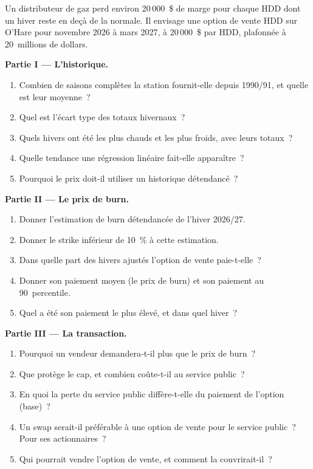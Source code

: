 \begin{problem}\label{pb:m3:freight-weather-and-other-corners:1}
Un distributeur de gaz perd environ 20\,000~\$ de marge pour chaque HDD dont un hiver reste en deçà de la normale. Il
envisage une option de vente HDD sur O'Hare pour novembre 2026 à mars 2027, à 20\,000~\$ par HDD, plafonnée à 20~millions de dollars.

\medskip\noindent\textbf{Partie I --- L'historique.}
\begin{enumerate}
\item Combien de saisons complètes la station fournit-elle depuis 1990/91, et quelle est leur moyenne~?
\item Quel est l'écart type des totaux hivernaux~?
\item Quels hivers ont été les plus chauds et les plus froids, avec leurs totaux~?
\item Quelle tendance une régression linéaire fait-elle apparaître~?
\item Pourquoi le prix doit-il utiliser un historique détendancé~?
\end{enumerate}

\medskip\noindent\textbf{Partie II --- Le prix de burn.}
\begin{enumerate}[resume]
\item Donner l'estimation de burn détendancée de l'hiver 2026/27.
\item Donner le strike inférieur de 10~\% à cette estimation.
\item Dans quelle part des hivers ajustés l'option de vente paie-t-elle~?
\item Donner son paiement moyen (le prix de burn) et son paiement au 90~percentile.
\item Quel a été son paiement le plus élevé, et dans quel hiver~?
\end{enumerate}

\medskip\noindent\textbf{Partie III --- La transaction.}
\begin{enumerate}[resume]
\item Pourquoi un vendeur demandera-t-il plus que le prix de burn~?
\item Que protège le cap, et combien coûte-t-il au service public~?
\item En quoi la perte du service public diffère-t-elle du paiement de l'option (base)~?
\item Un swap serait-il préférable à une option de vente pour le service public~? Pour ses actionnaires~?
\item Qui pourrait vendre l'option de vente, et comment la couvrirait-il~?
\end{enumerate}


\end{problem}
